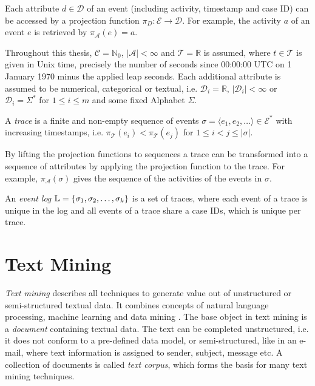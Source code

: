 Each attribute $d \in \mathcal{D}$ of an event (including activity, timestamp and case ID) can be accessed by a projection function $\pi_D \colon \mathcal{E} \to \mathcal{D}$.
For example, the activity $a$ of an event $e$ is retrieved by $\pi_\mathcal{A}(e) = a$.

Throughout this thesis,  $\mathcal{C} = \mathbb{N}_0$, $|\mathcal{A}| < \infty$ and $ \mathcal{T} = \mathbb{R}$ is assumed, where $t \in \mathcal{T}$ is given in Unix time, precisely the number of seconds since 00:00:00 UTC on 1 January 1970 minus the applied leap seconds.
Each additional attribute is assumed to be numerical, categorical or textual, i.e. $\mathcal{D}_i = \mathbb{R}$, $|\mathcal{D}_i| < \infty$ or $\mathcal{D}_i = \Sigma^\ast$  for $1 \leq i \leq m$ and some fixed Alphabet $\Sigma$.

\begin{definition}[Trace]
	A \textit{trace} is a finite and non-empty sequence of events $\sigma = \langle e_1, e_2, \dots\rangle \in  \mathcal{E}^\ast$ with increasing timestamps, i.e. $\pi_\mathcal{T} (e_i) < \pi_\mathcal{T} (e_j) $ for $1 \leq i < j \leq |\sigma|$.
\end{definition}


By lifting the projection functions to sequences a trace can be transformed into a sequence of attributes by applying the projection function to the trace.
For example, $\pi_\mathcal{A}(\sigma)$ gives the sequence of the activities of the events in $\sigma$.

\begin{definition}
	An \textit{event log} $\mathbb{L} = \{ \sigma_1, \sigma _2, \dots, \sigma_k \}$ is a set of traces, where each event of a trace is unique in the log and all events of a trace share a case IDs, which is unique per trace.
\end{definition}

\section{Text Mining}

\textit{Text mining} describes all techniques to generate value out of unstructured or semi-structured textual data.
It combines concepts of natural language processing, machine learning and data mining \cite{DBLP:journals/coling/Mihalcea08}.
The base object in text mining is a \textit{document} containing textual data.
The text can be completed unstructured, i.e. it does not conform to a pre-defined data model, or semi-structured, like in an e-mail, where text information is assigned to sender, subject, message etc.
A collection of documents is called \textit{text corpus}, which forms the basis for many text mining techniques.

